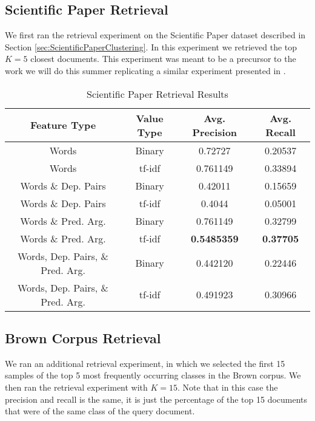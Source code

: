 \documentclass[11pt]{article}
\newcommand{\headcol}{\rowcolor{tableheadcolor}} %
\begin{document}
\subsection{Scientific Paper Retrieval}

We first ran the retrieval experiment on the Scientific Paper dataset described in Section \ref{sec:ScientificPaperClustering}. In this experiment we retrieved the top $K=5$ closest
documents. This experiment was meant to be a precursor to the work we will do this summer replicating a similar experiment presented in \cite{Hurtado2013}. 

\begin{table}[H]
\centering
\caption{Scientific Paper Retrieval Results}
\label{tbl:ScientificPaperRetrievalResults}
\begin{tabular}{|c|c|c|c|}
\hline
\headcol \color{white} Feature Type & \color{white} Value Type & \color{white} Avg. Precision  & \color{white} Avg. Recall \\
\hline
Words & Binary & 0.72727 &   0.20537  \\
Words & tf-idf &  0.761149  & 0.33894\\
Words \& Dep. Pairs & Binary & 0.42011 & 0.15659 \\
Words \& Dep. Pairs & tf-idf & 0.4044 & 0.05001 \\
Words \& Pred. Arg. & Binary & 0.761149  & 0.32799 \\
Words \& Pred. Arg.  & tf-idf &  \textbf{0.5485359} & \textbf{0.37705} \\
Words, Dep. Pairs, \& Pred. Arg. & Binary & 0.442120 & 0.22446 \\
Words, Dep. Pairs, \& Pred. Arg.& tf-idf & 0.491923 & 0.30966 \\
\hline
\end{tabular}
\end{table}

\subsection{Brown Corpus Retrieval}

We ran an additional retrieval experiment, in which we selected the first 15 samples of the top 5 most frequently occurring classes in the Brown corpus. We then ran the retrieval experiment with $K=15$. Note that in this case the precision and recall is the same, it is just the percentage of the top 15 documents that were of the same class of the query document. 
\end{document}
